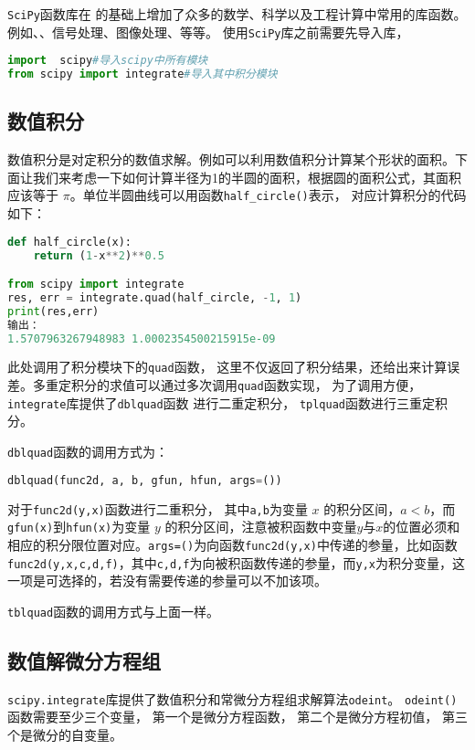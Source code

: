 
\verb|SciPy|函数库在 的基础上增加了众多的数学、科学以及工程计算中常用的库函数。例如、、信号处理、图像处理、等等。
使用\verb|SciPy|库之前需要先导入库，
\begin{lstlisting}[language=python]
import  scipy#导入scipy中所有模块
from scipy import integrate#导入其中积分模块
\end{lstlisting}
\subsection{数值积分}
数值积分是对定积分的数值求解。例如可以利用数值积分计算某个形状的面积。下面让我们来考虑一下如何计算半径为1的半圆的面积，根据圆的面积公式，其面积应该等于 $\pi$。单位半圆曲线可以用函数\verb|half_circle()|表示， 对应计算积分的代码如下：
\begin{lstlisting}[language=python]
def half_circle(x):
    return (1-x**2)**0.5

from scipy import integrate
res, err = integrate.quad(half_circle, -1, 1)
print(res,err)
输出：
1.5707963267948983 1.0002354500215915e-09
\end{lstlisting}
此处调用了积分模块下的\verb|quad|函数， 这里不仅返回了积分结果，还给出来计算误差。多重定积分的求值可以通过多次调用\verb|quad|函数实现， 为了调用方便， \verb|integrate|库提供了\verb|dblquad|函数
进行二重定积分， \verb|tplquad|函数进行三重定积分。

\verb|dblquad|函数的调用方式为：
\begin{lstlisting}[language=python]
dblquad(func2d, a, b, gfun, hfun, args=())
\end{lstlisting}
对于\verb|func2d(y,x)|函数进行二重积分， 其中\verb|a,b|为变量 $x$ 的积分区间，$ a < b $，而\verb|gfun(x)|到\verb|hfun(x)|为变量 $y$ 的积分区间，注意被积函数中变量$ y $与$ x $的位置必须和相应的积分限位置对应。\verb|args=()|为向函数\verb|func2d(y,x)|中传递的参量，比如函数\verb|func2d(y,x,c,d,f)|，其中\verb|c,d,f|为向被积函数传递的参量，而\verb|y,x|为积分变量，这一项是可选择的，若没有需要传递的参量可以不加该项。

\verb|tblquad|函数的调用方式与上面一样。

\subsection{数值解微分方程组}
\verb|scipy.integrate|库提供了数值积分和常微分方程组求解算法\verb|odeint|。
\verb|odeint()|函数需要至少三个变量， 第一个是微分方程函数， 第二个是微分方程初值， 第三个是微分的自变量。

